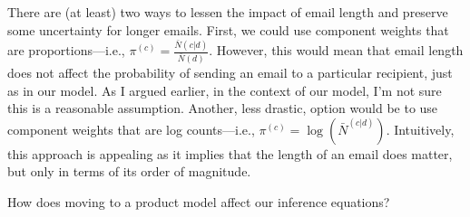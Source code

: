 \documentclass[10pt,english,oneside]{article}
\begin{document}
There are (at least) two ways to lessen the impact of email length and
preserve some uncertainty for longer emails. First, we could use
component weights that are proportions---i.e., $\pi^{(c)} =
\frac{\bar{N}(c|d)}{\bar{N}(d)}$. However, this would mean that email
length does not affect the probability of sending an email to a
particular recipient, just as in our model. As I argued earlier, in
the context of our model, I'm not sure this is a reasonable
assumption. Another, less drastic, option would be to use component
weights that are log counts---i.e., $\pi^{(c)} =
\log{(\bar{N}^{(c|d)})}$. Intuitively, this approach is appealing as
it implies that the length of an email does matter, but only in terms
of its order of magnitude.

How does moving to a product model affect our inference equations?
\end{document}
